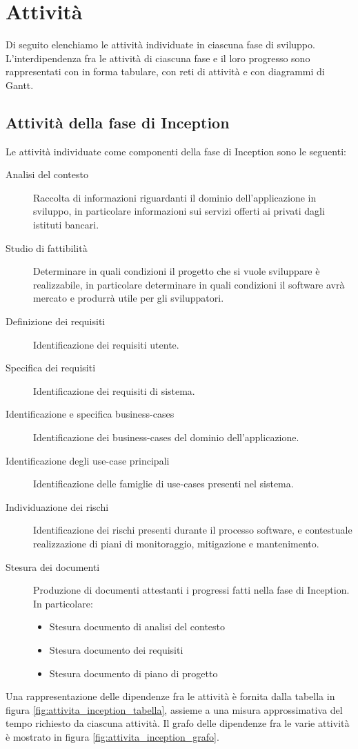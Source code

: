 \section{Attivit\`a}

Di seguito elenchiamo le attivit\`a individuate in ciascuna fase di sviluppo.
L'interdipendenza fra le attivit\`a di ciascuna fase e il loro progresso sono rappresentati con in forma tabulare, con reti di attivit\`a e con diagrammi di Gantt.


\subsection{Attivit\`a della fase di Inception}

Le attivit\`a individuate come componenti della fase di Inception sono le seguenti:
\begin{description}
	\item[Analisi del contesto]
		Raccolta di informazioni riguardanti il dominio dell'applicazione in sviluppo, in particolare informazioni sui servizi offerti ai privati dagli istituti bancari.
	\item[Studio di fattibilit\`a]
		Determinare in quali condizioni il progetto che si vuole sviluppare \`e realizzabile, in particolare determinare in quali condizioni il software avr\`a mercato e produrr\`a utile per gli sviluppatori.
	\item[Definizione dei requisiti]
		Identificazione dei requisiti utente.
	\item[Specifica dei requisiti]
		Identificazione dei requisiti di sistema.
	\item[Identificazione e specifica business-cases]
		Identificazione dei business-cases del dominio dell'applicazione.
	\item[Identificazione degli use-case principali]
		Identificazione delle famiglie di use-cases presenti nel sistema.
	\item[Individuazione dei rischi]
		Identificazione dei rischi presenti durante il processo software, e contestuale realizzazione di piani di monitoraggio, mitigazione e mantenimento.
	\item[Stesura dei documenti]
		Produzione di documenti attestanti i progressi fatti nella fase di Inception.
		In particolare:
		\begin{itemize}
			\item Stesura documento di analisi del contesto
			\item Stesura documento dei requisiti
			\item Stesura documento di piano di progetto
		\end{itemize}
\end{description}
Una rappresentazione delle dipendenze fra le attivit\`a \`e fornita dalla tabella in figura \ref{fig:attivita_inception_tabella}, assieme a una misura approssimativa del tempo richiesto da ciascuna attivit\`a.
Il grafo delle dipendenze fra le varie attivit\`a \`e mostrato in figura \ref{fig:attivita_inception_grafo}.

